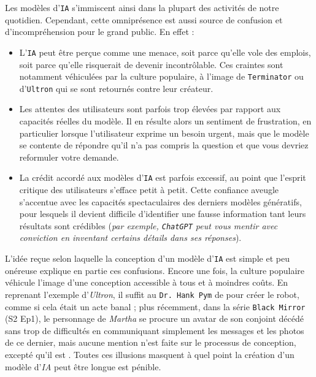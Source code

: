 		Les modèles d'\texttt{IA} s'immiscent ainsi dans la plupart des activités de notre quotidien.
		Cependant, cette omniprésence est aussi source de confusion et d'incompréhension pour le grand public.
		En effet :
		\begin{itemize}
			\item L'\texttt{IA} peut être perçue comme une menace, soit parce qu'elle vole des emplois, soit parce qu'elle risquerait de devenir incontrôlable.
			Ces craintes sont notamment véhiculées par la culture populaire, à l'image de \texttt{Terminator} ou d'\texttt{Ultron} qui se sont retournés contre leur créateur.
			\item Les attentes des utilisateurs sont parfois trop élevées par rapport aux capacités réelles du modèle.
			Il en résulte alors un sentiment de frustration, en particulier lorsque l'utilisateur exprime un besoin urgent, mais que le modèle se contente de répondre qu'il n'a pas compris la question et que vous devriez reformuler votre demande.
			\item La crédit accordé aux modèles d'\texttt{IA} est parfois excessif, au point que l'esprit critique des utilisateurs s'efface petit à petit.
			Cette confiance aveugle s'accentue avec les capacités spectaculaires des derniers modèles génératifs, pour lesquels il devient difficile d'identifier une fausse information tant leurs résultats sont crédibles (\textit{par exemple, \texttt{ChatGPT} peut vous mentir avec conviction en inventant certains détails dans ses réponses}). 
		\end{itemize}
		
		L'idée reçue selon laquelle la conception d'un modèle d'\texttt{IA} est simple et peu onéreuse explique en partie ces confusions.
		Encore une fois, la culture populaire véhicule l'image d'une conception accessible à tous et à moindres coûts.
		En reprenant l'exemple d'\textit{Ultron}, il suffit au \texttt{Dr. Hank Pym} de  pour créer le robot, comme si cela était un acte banal ; plus récemment, dans la série \texttt{Black Mirror} (S2 Ep1), le personnage de \textit{Martha} se procure un avatar de son conjoint décédé sans trop de difficultés en communiquant simplement les messages et les photos de ce dernier, mais aucune mention n'est faite sur le processus de conception, excepté qu'il est .
		Toutes ces illusions masquent à quel point la création d'un modèle d'\textit{IA} peut être longue est pénible.
		

